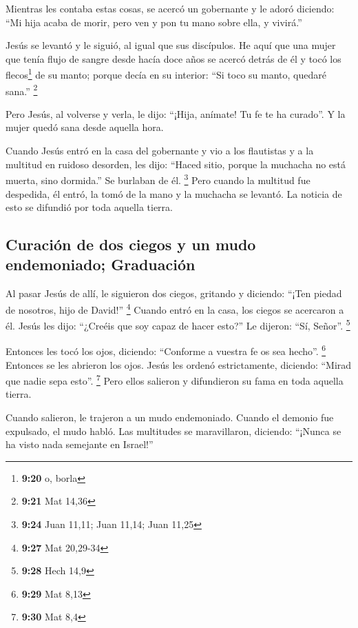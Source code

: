 \begin{paracol}{2}
 Mientras les contaba estas cosas, se acercó un
gobernante y le adoró diciendo: ``Mi hija acaba de morir, pero ven y pon
tu mano sobre ella, y vivirá.''

 Jesús se levantó y le siguió, al igual que sus
discípulos.  He aquí que una mujer que tenía flujo de
sangre desde hacía doce años se acercó detrás de él y tocó los
flecos\footnote{\textbf{9:20} o, borla} de su manto; 
porque decía en su interior: ``Si toco su manto, quedaré sana.''
\footnote{\textbf{9:21} Mat 14,36}

 Pero Jesús, al volverse y verla, le dijo: ``¡Hija,
anímate! Tu fe te ha curado''. Y la mujer quedó sana desde aquella hora.

 Cuando Jesús entró en la casa del gobernante y vio a los
flautistas y a la multitud en ruidoso desorden,  les
dijo: ``Haced sitio, porque la muchacha no está muerta, sino dormida.''
Se burlaban de él. \footnote{\textbf{9:24} Juan 11,11; Juan 11,14; Juan
  11,25}  Pero cuando la multitud fue despedida, él
entró, la tomó de la mano y la muchacha se levantó.  La
noticia de esto se difundió por toda aquella tierra.

\hypertarget{curaciuxf3n-de-dos-ciegos-y-un-mudo-endemoniado-graduaciuxf3n}{%
\subsection{Curación de dos ciegos y un mudo endemoniado;
Graduación}\label{curaciuxf3n-de-dos-ciegos-y-un-mudo-endemoniado-graduaciuxf3n}}

 Al pasar Jesús de allí, le siguieron dos ciegos,
gritando y diciendo: ``¡Ten piedad de nosotros, hijo de David!''
\footnote{\textbf{9:27} Mat 20,29-34}  Cuando entró en la
casa, los ciegos se acercaron a él. Jesús les dijo: ``¿Creéis que soy
capaz de hacer esto?'' Le dijeron: ``Sí, Señor''. \footnote{\textbf{9:28}
  Hech 14,9}

 Entonces les tocó los ojos, diciendo: ``Conforme a
vuestra fe os sea hecho''. \footnote{\textbf{9:29} Mat 8,13}
 Entonces se les abrieron los ojos. Jesús les ordenó
estrictamente, diciendo: ``Mirad que nadie sepa esto''. \footnote{\textbf{9:30}
  Mat 8,4}  Pero ellos salieron y difundieron su fama en
toda aquella tierra.

 Cuando salieron, le trajeron a un mudo endemoniado.
 Cuando el demonio fue expulsado, el mudo habló. Las
multitudes se maravillaron, diciendo: ``¡Nunca se ha visto nada
semejante en Israel!''


\end{paracol}
